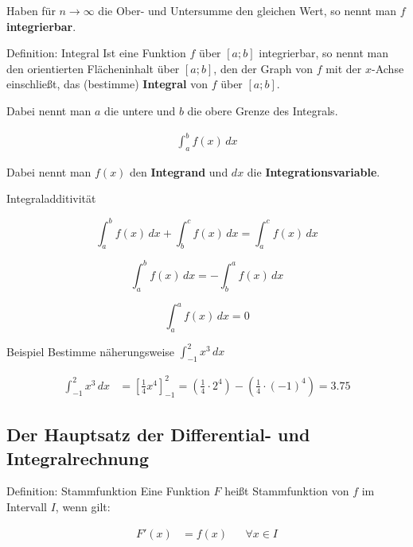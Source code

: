 \documentclass{article}
\begin{document}
Haben für $n \to \infty$ die Ober- und Untersumme den gleichen Wert,
so nennt man $f$ \textbf{integrierbar}.
\newpage
\begin{boxx}[Red]{Definition: Integral}
    Ist eine Funktion $f$ über $[a;b]$ integrierbar,
    so nennt man den orientierten Flächeninhalt über $[a;b]$,
    den der Graph von $f$ mit der $x$-Achse einschließt,
    das (bestimme) \textbf{Integral} von $f$ über $[a;b]$.

    Dabei nennt man $a$ die untere und $b$ die obere Grenze des Integrals.

    \begin{align*}
        \int_a^b f(x) \, dx
    \end{align*}

    Dabei nennt man $f(x)$ den \textbf{Integrand} und $dx$ die \textbf{Integrationsvariable}.
\end{boxx}

\begin{boxx}[LightGreen]{Integraladditivität}

    \[\int_a^b f(x) \, dx + \int_b^c f(x) \, dx = \int_a^c f(x) \, dx\]

    \[\int_a^b f(x) \, dx = - \int_b^a f(x) \, dx\]

    \[\int_a^a f(x) \, dx = 0\]

\end{boxx}

\begin{boxx}[DarkBlue]{Beispiel}
    Bestimme näherungsweise $\displaystyle \int_{-1}^2 x^3 \, dx$

    \begin{align*}
        \int_{-1}^2 x^3 \, dx &= \left[\frac{1}{4}x^4\right]_{-1}^2
        = \left(\frac{1}{4}\cdot 2^4\right) - \left(\frac{1}{4} \cdot (-1)^4\right)
        = 3.75
    \end{align*}
\end{boxx}


\subsection{Der Hauptsatz der Differential- und Integralrechnung}

\begin{boxx}[Red]{Definition: Stammfunktion}
    Eine Funktion $F$ heißt Stammfunktion von $f$ im Intervall $I$, wenn gilt:

    \begin{align*}
        &&&&&& F'(x) &= f(x) & &\forall x \in I &&&&&&
    \end{align*}
\end{boxx}
\end{document}
